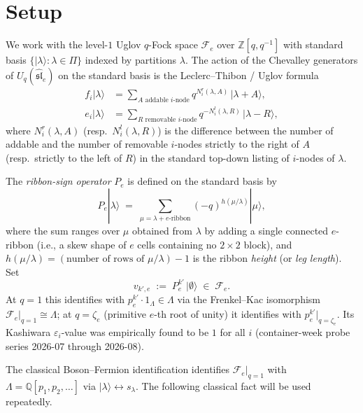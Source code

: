 \documentclass[11pt]{article}
\theoremstyle{definition}
\newcommand{\Fock}{\mathcal{F}}
\newcommand{\Uq}{U_q(\widehat{\mathfrak{sl}}_e)}
\newcommand{\vke}{v_{k',e}}
\begin{document}
\section{Setup}

We work with the level-$1$ Uglov $q$-Fock space $\Fock_e$ over $\mathbb{Z}[q, q^{-1}]$
with standard basis $\{|\lambda\rangle : \lambda \in \Pi\}$ indexed by partitions
$\lambda$. The action of the Chevalley generators of $\Uq$ on the standard basis
is the Leclerc--Thibon / Uglov formula
\begin{align}
    f_i |\lambda\rangle &= \sum_{A \text{ addable } i\text{-node}} q^{N_i^r(\lambda, A)} \, |\lambda + A\rangle, \\
    e_i |\lambda\rangle &= \sum_{R \text{ removable } i\text{-node}} q^{-N_i^l(\lambda, R)} \, |\lambda - R\rangle,
\end{align}
where $N_i^r(\lambda, A)$ (resp.\ $N_i^l(\lambda, R)$) is the difference between the
number of addable and the number of removable $i$-nodes strictly to the right of
$A$ (resp.\ strictly to the left of $R$) in the standard top-down listing of
$i$-nodes of $\lambda$.

The \emph{ribbon-sign operator} $P_e$ is defined on the standard basis by
\begin{equation} \label{eq:Pe}
    P_e |\lambda\rangle \;=\; \sum_{\mu = \lambda + e\text{-ribbon}} (-q)^{h(\mu/\lambda)} |\mu\rangle,
\end{equation}
where the sum ranges over $\mu$ obtained from $\lambda$ by adding a single connected
$e$-ribbon (i.e., a skew shape of $e$ cells containing no $2 \times 2$ block), and
$h(\mu/\lambda) = (\text{number of rows of } \mu/\lambda) - 1$ is the ribbon
\emph{height} (or \emph{leg length}). Set
\begin{equation}
    \vke \;:=\; P_e^{k'} \,|\emptyset\rangle \;\in\; \Fock_e.
\end{equation}
At $q=1$ this identifies with $p_e^{k'} \cdot 1_\Lambda \in \Lambda$ via the
Frenkel--Kac isomorphism $\Fock_e |_{q=1} \cong \Lambda$; at $q = \zeta_e$
(primitive $e$-th root of unity) it identifies with $p_e^{k'}|_{q = \zeta_e}$.
Its Kashiwara $\varepsilon_i$-value was empirically found to be $1$ for all $i$
(container-week probe series 2026-07 through 2026-08).

The classical Boson--Fermion identification identifies $\Fock_e|_{q=1}$ with
$\Lambda = \mathbb{Q}[p_1, p_2, \ldots]$ via $|\lambda\rangle \leftrightarrow s_\lambda$.
The following classical fact will be used repeatedly.
\end{document}
